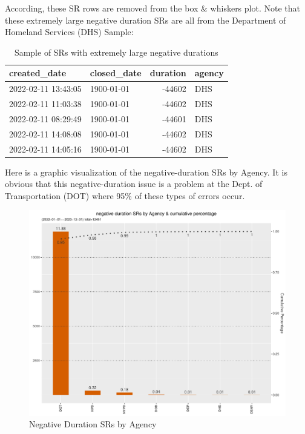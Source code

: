\documentclass[12pt, titlepage]{article}
\begin{document}
{According, these  SR rows are removed from the box \& whiskers plot. 
Note that these extremely large negative duration SRs are all from the 
Department of Homeland Services (DHS) Sample: 

\begin{table}[tbp]
    \centering
     \normalsize
    \caption{Sample of SRs with extremely large negative durations}
    \begin{tabular}{l l r l}
        \toprule
        \textbf{created\_date} & \textbf{closed\_date} & \textbf{duration} 
        & \textbf{agency} \\
	        \midrule
	        2022-02-11 13:43:05 & 1900-01-01 & -44602 & DHS \\
	        2022-02-11 11:03:38 & 1900-01-01 & -44602 & DHS \\
	        2022-02-11 08:29:49 & 1900-01-01 & -44601 & DHS \\
	        2022-02-11 14:08:08 & 1900-01-01 & -44602 & DHS \\
	        2022-02-11 14:05:16 & 1900-01-01 & -44602 & DHS \\
	        \bottomrule
    \end{tabular}
    \label{tab:extreme_negative_durations}
\end{table}

Here is a graphic visualization of the negative-duration SRs by Agency. It is 
obvious that this negative-duration issue is a problem at the 
Dept. of Transportation (DOT) where 95\% of these types of errors occur. 


\begin{figure}[tbp]
 	 \centering
 	 \includegraphics[width = \textwidth]{negative_duration_SR_barchart.pdf}
	  \caption{Negative Duration SRs by Agency}
	  \label{fig:negative-duration}
\end{figure}

}
\end{document}
